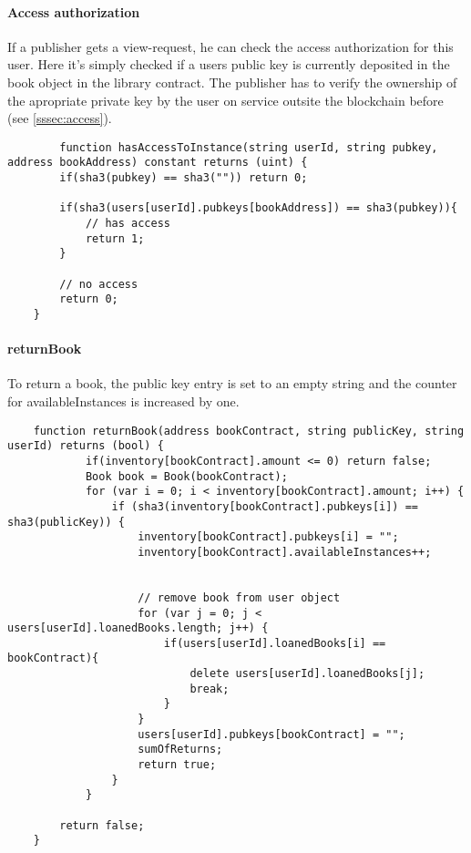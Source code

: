 \paragraph*{Access authorization}
If a publisher gets a view-request, he can check the access authorization for this user. Here it's simply checked if a users public key is currently deposited in the book object in the library contract.
The publisher has to verify the ownership of the apropriate private key by the user on service outsite the blockchain before (see \ref{sssec:access}).

\begin{lstlisting}
	    function hasAccessToInstance(string userId, string pubkey, address bookAddress) constant returns (uint) {
        if(sha3(pubkey) == sha3("")) return 0;

        if(sha3(users[userId].pubkeys[bookAddress]) == sha3(pubkey)){
            // has access
            return 1;
        }

        // no access
        return 0;
    }
\end{lstlisting}


\paragraph*{returnBook}
To return a book, the public key entry is set to an empty string and the counter for availableInstances is increased by one.

\begin{lstlisting}
	function returnBook(address bookContract, string publicKey, string userId) returns (bool) {
    		if(inventory[bookContract].amount <= 0) return false;
    		Book book = Book(bookContract);
            for (var i = 0; i < inventory[bookContract].amount; i++) {
                if (sha3(inventory[bookContract].pubkeys[i]) == sha3(publicKey)) {
                    inventory[bookContract].pubkeys[i] = "";
                    inventory[bookContract].availableInstances++;


                    // remove book from user object
                    for (var j = 0; j < users[userId].loanedBooks.length; j++) {
                        if(users[userId].loanedBooks[i] == bookContract){
                            delete users[userId].loanedBooks[j];
                            break;
                        }
                    }
                    users[userId].pubkeys[bookContract] = "";
                    sumOfReturns;
                    return true;
                }
            }

        return false;
    }
\end{lstlisting}

